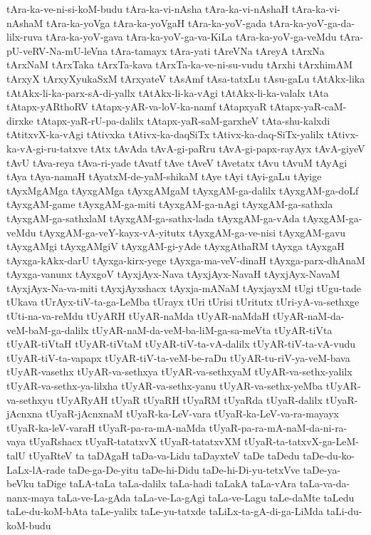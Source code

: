 {tAra-ka-ve-ni-si-koM-budu
tAra-ka-vi-nAsha
tAra-ka-vi-nAshaH
tAra-ka-vi-nAshaM
tAra-ka-yoVga
tAra-ka-yoVgaH
tAra-ka-yoV-gada
tAra-ka-yoV-ga-da-lilx-ruva
tAra-ka-yoV-gava
tAra-ka-yoV-ga-va-KiLa
tAra-ka-yoV-ga-veMdu
tAra-pU-veRV-Na-mU-leVna
tAra-tamayx
tAra-yati
tAreVNa
tAreyA
tArxNa
tArxNaM
tArxTaka
tArxTa-kava
tArxTa-ka-ve-ni-su-vudu
tArxhi
tArxhimAM
tArxyX
tArxyXyukaSxM
tArxyateV
tAsAmf
tAsa-tatxLu
tAsu-gaLu
tAtAkx-lika
tAtAkx-li-ka-parx-sA-di-yallx
tAtAkx-li-ka-vAgi
tAtAkx-li-ka-valalx
tAta
tAtapx-yARthoRV
tAtapx-yAR-va-loV-ka-namf
tAtapxyaR
tAtapx-yaR-caM-dirxke
tAtapx-yaR-rU-pa-dalilx
tAtapx-yaR-saM-garxheV
tAta-shu-kalxdi
tAtitxvX-ka-vAgi
tAtivxka
tAtivx-ka-daqSiTx
tAtivx-ka-daq-SiTx-yalilx
tAtivx-ka-vA-gi-ru-tatxve
tAtx
tAvAda
tAvA-gi-paRru
tAvA-gi-papx-rayAyx
tAvA-giyeV
tAvU
tAva-reya
tAva-ri-yade
tAvatf
tAve
tAveV
tAvetatx
tAvu
tAvuM
tAyAgi
tAya
tAya-namaH
tAyatxM-de-yaM-shikaM
tAye
tAyi
tAyi-gaLu
tAyige
tAyxMgAMga
tAyxgAMga
tAyxgAMgaM
tAyxgAM-ga-dalilx
tAyxgAM-ga-doLf
tAyxgAM-game
tAyxgAM-ga-miti
tAyxgAM-ga-nAgi
tAyxgAM-ga-sathxla
tAyxgAM-ga-sathxlaM
tAyxgAM-ga-sathx-lada
tAyxgAM-ga-vAda
tAyxgAM-ga-veMdu
tAyxgAM-ga-veY-kayx-vA-yitutx
tAyxgAM-ga-ve-nisi
tAyxgAM-gavu
tAyxgAMgi
tAyxgAMgiV
tAyxgAM-gi-yAde
tAyxgAthaRM
tAyxga
tAyxgaH
tAyxga-kAkx-darU
tAyxga-kirx-yege
tAyxga-ma-veV-dinaH
tAyxga-parx-dhAnaM
tAyxga-vanunx
tAyxgoV
tAyxjAyx-Nava
tAyxjAyx-NavaH
tAyxjAyx-NavaM
tAyxjAyx-Na-va-miti
tAyxjAyxshacx
tAyxja-mANaM
tAyxjayxM
tUgi
tUgu-tade
tUkava
tUrAyx-tiV-ta-ga-LeMba
tUrayx
tUri
tUrisi
tUritutx
tUri-yA-va-sethxge
tUti-na-va-reMdu
tUyARH
tUyAR-naMda
tUyAR-naMdaH
tUyAR-naM-da-veM-baM-ga-dalilx
tUyAR-naM-da-veM-ba-liM-ga-sa-meVta
tUyAR-tiVta
tUyAR-tiVtaH
tUyAR-tiVtaM
tUyAR-tiV-ta-vA-dalilx
tUyAR-tiV-ta-vA-vudu
tUyAR-tiV-ta-vapapx
tUyAR-tiV-ta-veM-be-raDu
tUyAR-tu-riV-ya-veM-bava
tUyAR-vasethx
tUyAR-va-sethxya
tUyAR-va-sethxyaM
tUyAR-va-sethx-yalilx
tUyAR-va-sethx-ya-lilxha
tUyAR-va-sethx-yanu
tUyAR-va-sethx-yeMba
tUyAR-va-sethxyu
tUyARyAH
tUyaR
tUyaRH
tUyaRM
tUyaRda
tUyaR-dalilx
tUyaR-jAcnxna
tUyaR-jAcnxnaM
tUyaR-ka-LeV-vara
tUyaR-ka-LeV-va-ra-mayayx
tUyaR-ka-leV-varaH
tUyaR-pa-ra-mA-naMda
tUyaR-pa-ra-mA-naM-da-ni-ra-vaya
tUyaRshacx
tUyaR-tatatxvX
tUyaR-tatatxvXM
tUyaR-ta-tatxvX-ga-LeM-talU
tUyaRteV
ta
taDAgaH
taDa-va-Lidu
taDayxteV
taDe
taDedu
taDe-du-ko-LaLx-lA-rade
taDe-ga-De-yitu
taDe-hi-Didu
taDe-hi-Di-yu-tetxVve
taDe-ya-beVku
taDige
taLA-taLa
taLa-dalilx
taLa-hadi
taLakA
taLa-vAra
taLa-va-da-nanx-maya
taLa-ve-La-gAda
taLa-ve-La-gAgi
taLa-ve-Lagu
taLe-daMte
taLedu
taLe-du-koM-bAta
taLe-yalilx
taLe-yu-tatxde
taLiLx-ta-gA-di-ga-LiMda
taLi-du-koM-budu
}
